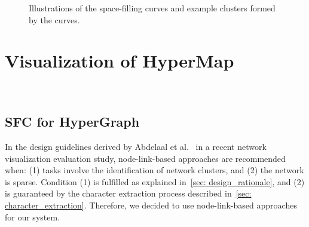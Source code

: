 \begin{figure}%
    \centering
    \qquad
    \qquad
    \qquad
    \captionsetup{belowskip=-14pt,aboveskip=3pt}
    \caption{
        Illustrations of the space-filling curves and example clusters formed by the curves.
    }%
    \label{fig: gilbert}%
\end{figure}
\vspace*{-0.3cm}
\section{Visualization of HyperMap}~\label{sec: visualization}
\vspace*{-0.6cm}
\subsection{SFC for HyperGraph}
In the design guidelines derived by Abdelaal et al.~\cite{abdelaal2022network} in a recent network visualization evaluation study, node-link-based approaches are recommended when:
(1) tasks involve the identification of network clusters, and (2) the network is sparse.
Condition (1) is fulfilled as explained in~\autoref{sec: design_rationale}, and (2) is guaranteed by the character extraction process described in~\autoref{sec: character_extraction}. 
Therefore, we decided to use node-link-based approaches for our system.


